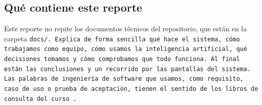 \subsection{Qué contiene este reporte}\label{sec:contenido}

Este reporte no repite los documentos técnicos del repositorio, que están en la carpeta \tt{docs/}. Explica de forma sencilla qué hace el sistema, cómo trabajamos como equipo, cómo usamos la inteligencia artificial, qué decisiones tomamos y cómo comprobamos que todo funciona. Al final están las conclusiones y un recorrido por las pantallas del sistema. Las palabras de ingeniería de software que usamos, como requisito, caso de uso o prueba de aceptación, tienen el sentido de los libros de consulta del curso \parencite{sommerville,pressman}.
